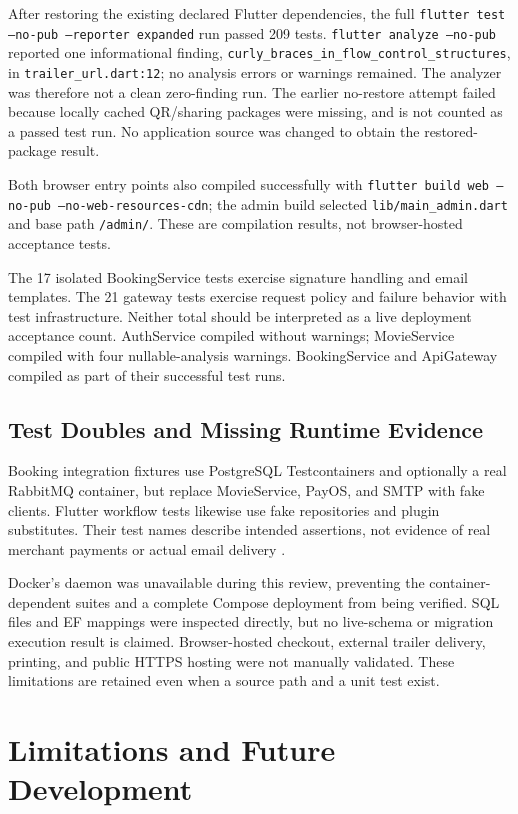 \documentclass[conference]{IEEEtran}
\newcommand{\code}[1]{\texttt{#1}}
\begin{document}
After restoring the existing declared Flutter dependencies, the full
\code{flutter test --no-pub --reporter expanded} run passed 209 tests.
\code{flutter analyze --no-pub} reported one informational finding,
\code{curly\_braces\_in\_flow\_control\_structures}, in
\code{trailer\_url.dart:12}; no analysis errors or warnings remained.
The analyzer was therefore not a clean zero-finding run. The earlier
no-restore attempt failed because locally cached QR/sharing packages were
missing, and is not counted as a passed test run. No application source
was changed to obtain the restored-package result.

Both browser entry points also compiled successfully with
\code{flutter build web --no-pub --no-web-resources-cdn}; the admin build
selected \code{lib/main\_admin.dart} and base path \code{/admin/}.
These are compilation results, not browser-hosted acceptance tests.



The 17 isolated BookingService tests exercise signature handling and email
templates. The 21 gateway tests exercise request policy and failure behavior
with test infrastructure. Neither total should be interpreted as a live
deployment acceptance count. AuthService compiled without warnings; MovieService
compiled with four nullable-analysis warnings. BookingService and ApiGateway
compiled as part of their successful test runs.

\subsection{Test Doubles and Missing Runtime Evidence}
Booking integration fixtures use PostgreSQL Testcontainers and optionally a
real RabbitMQ container, but replace MovieService, PayOS, and SMTP with fake
clients. Flutter workflow tests likewise use fake repositories and plugin
substitutes. Their test names describe intended assertions, not evidence of
real merchant payments or actual email delivery \cite{tests}.

Docker's daemon was unavailable during this review, preventing the
container-dependent suites and a complete Compose deployment from being
verified. SQL files and EF mappings were inspected directly, but no live-schema
or migration execution result is claimed. Browser-hosted checkout, external
trailer delivery, printing, and public HTTPS hosting were not manually
validated. These limitations are retained even when a source path and a unit
test exist.

\section{Limitations and Future Development}
\end{document}
